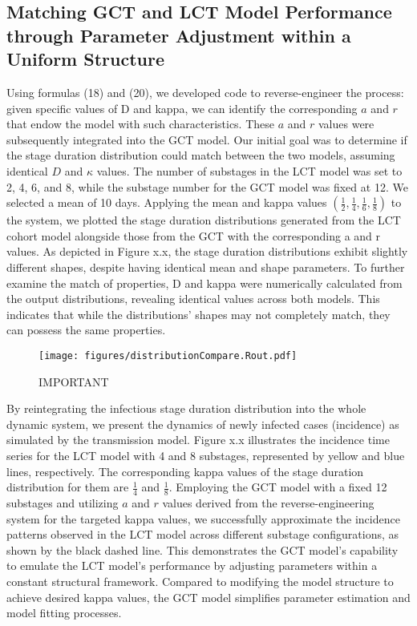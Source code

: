\documentclass[12pt]{article}
\begin{document}
\subsection{Matching GCT and LCT Model Performance through Parameter Adjustment within a Uniform Structure}

Using formulas (18) and (20), we developed code to reverse-engineer the process: given specific values of D and kappa, we can identify the corresponding $a$ and $r$ that endow the model with such characteristics. These $a$ and $r$ values were subsequently integrated into the GCT model. Our initial goal was to determine if the stage duration distribution could match between the two models, assuming identical $D$ and $\kappa$ values. The number of substages in the LCT model was set to 2, 4, 6, and 8, while the substage number for the GCT model was fixed at 12. We selected a mean of 10 days. Applying the mean and kappa values $\left( \frac{1}{2}, \frac{1}{4}, \frac{1}{6}, \frac{1}{8} \right)$ to the system, we plotted the stage duration distributions generated from the LCT cohort model alongside those from the GCT with the corresponding a and r values. As depicted in Figure x.x, the stage duration distributions exhibit slightly different shapes, despite having identical mean and shape parameters. To further examine the match of properties, D and kappa were numerically calculated from the output distributions, revealing identical values across both models. This indicates that while the distributions' shapes may not completely match, they can possess the same properties.

\begin{figure}[h]
    \centering
    \texttt{[image: figures/distributionCompare.Rout.pdf]}
    \caption{IMPORTANT}
\end{figure}

By reintegrating the infectious stage duration distribution into the whole dynamic system, we present the dynamics of newly infected cases (incidence) as simulated by the transmission model. Figure x.x illustrates the incidence time series for the LCT model with 4 and 8 substages, represented by yellow and blue lines, respectively. The corresponding kappa values of the stage duration distribution for them are $\frac{1}{4}$ and $\frac{1}{8}$. Employing the GCT model with a fixed 12 substages and utilizing $a$ and $r$ values derived from the reverse-engineering system for the targeted kappa values, we successfully approximate the incidence patterns observed in the LCT model across different substage configurations, as shown by the black dashed line. This demonstrates the GCT model's capability to emulate the LCT model's performance by adjusting parameters within a constant structural framework. Compared to modifying the model structure to achieve desired kappa values, the GCT model simplifies parameter estimation and model fitting processes. 
\end{document}
